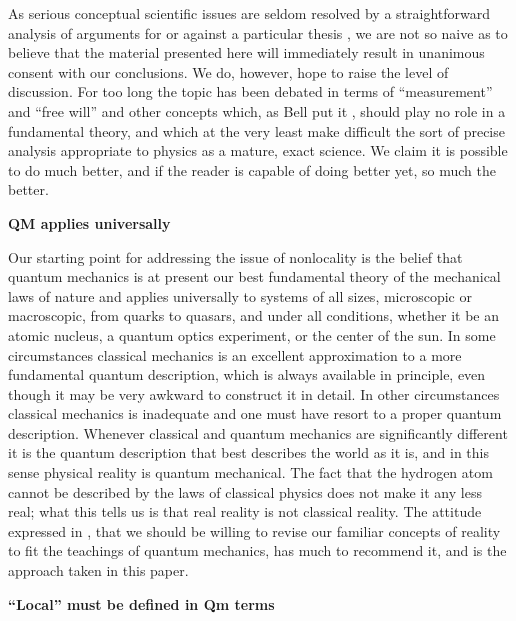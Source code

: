 \documentclass[10pt]{article} %
\def\outl#1{\par{\medskip\noindent\hspace*{.5cm}\bf
      \mathversion{bold}#1\mathversion{normal}\smallskip} }
\def\np{} \def\xa{} \def\xb{} \def\xn{} \def\xp{}
\def\outl#1{} \def\np{} \def\xa{} \def\xb{} \def\xn{} \def\xp{}
\def\outl#1{\par{\medskip\noindent\hspace*{.5cm}\bf
      \mathversion{bold}#1\mathversion{normal}\smallskip} }
\def\np{\newpage }\def\xn{\nopagebreak }\def\xp{\pagebreak }
\begin{document}
As serious conceptual scientific issues are seldom resolved by a
straightforward analysis of arguments for or against a particular thesis
\cite{Khn70}, we are not so naive as to believe that the material presented
here will immediately result in unanimous consent with our conclusions.  We
do, however, hope to raise the level of discussion.  For too long the topic
has been debated in terms of ``measurement'' and ``free will'' and other
concepts which, as Bell put it \cite{Bll90}, should play no role in a
fundamental theory, and which at the very least make difficult the sort of
precise analysis appropriate to physics as a mature, exact science.  We claim
it is possible to do much better, and if the reader is capable of doing better
yet, so much the better.


\xb
\outl{QM applies universally}
\xa



Our starting point for addressing the issue of nonlocality is the belief that
quantum mechanics is at present our best fundamental theory of the mechanical
laws of nature and applies universally to systems of all sizes, microscopic or
macroscopic, from quarks to quasars, and under all conditions, whether it be
an atomic nucleus, a quantum optics experiment, or the center of the sun.  In
some circumstances classical mechanics is an excellent approximation to a more
fundamental quantum description, which is always available in principle, even
though it may be very awkward to construct it in detail.  In other
circumstances classical mechanics is inadequate and one must have resort to a
proper quantum description. Whenever classical and quantum mechanics are
significantly different it is the quantum description that best describes the
world as it is, and in this sense physical reality is quantum mechanical.  The
fact that the hydrogen atom cannot be described by the laws of classical
physics does not make it any less real; what this tells us is that real
reality is not classical reality.  The attitude expressed in \cite{ChCr93},
 that we should be willing to revise our familiar concepts of
reality to fit the teachings of quantum mechanics, has much to recommend it,
and is the approach taken in this paper.


\xb
\outl{``Local'' must be defined in Qm terms}
\xa
\end{document}
